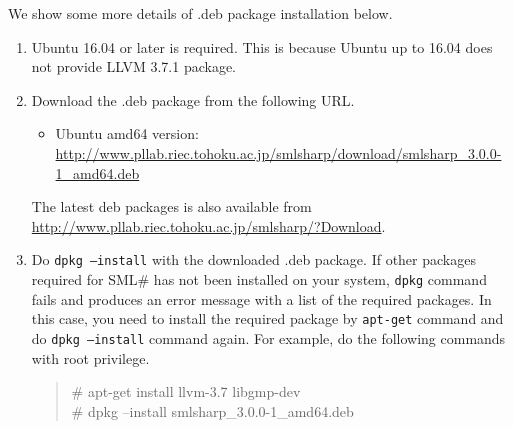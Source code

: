 \documentclass{jbook}
\newcommand{\smlsharp}{SML\#}
\newcommand{\version}{3.0.0}
\newcommand\eurl[1]{{\edef\eurlTMP{{#1}}\expandafter\url\eurlTMP}}
\newenvironment{program}{\begin{quote}\begin{tt}}%
                        {\end{tt}\end{quote}}
\begin{document}
	We show some more details of \mbox{.deb} package installation
below.

\begin{enumerate}
\item Ubuntu 16.04 or later is required.
	This is because Ubuntu up to 16.04 does not provide LLVM 3.7.1
package.
\item Download the \mbox{.deb} package from the following URL.
\begin{itemize}
\item Ubuntu amd64 version:
\eurl{http://www.pllab.riec.tohoku.ac.jp/smlsharp/download/smlsharp_\version-1\_amd64.deb}
\end{itemize}
	The latest deb packages is also available from
\url{http://www.pllab.riec.tohoku.ac.jp/smlsharp/?Download}.
\item 
	Do {\tt dpkg --install} with the downloaded \mbox{.deb} package.
	If other packages required for \smlsharp{} has not been installed
on your system, {\tt dpkg} command fails and produces an error message with
a list of the required packages.
	In this case, you need to install the required package by {\tt apt-get}
command and do {\tt dpkg --install} command again.
	For example, %
do the following commands with root privilege.
\begin{program}
\# apt-get install llvm-3.7 libgmp-dev\\
\# dpkg --install smlsharp\_\version{}-1\_amd64.deb
\end{program}
\end{enumerate}
\end{document}
